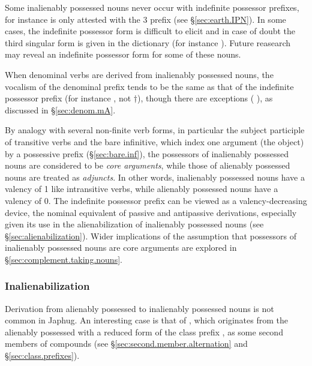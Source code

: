 Some inalienably possessed nouns never occur with indefinite possessor prefixes, for instance  is only attested with the 3\sg{}  prefix (see §\ref{sec:earth.IPN}). In some cases, the indefinite possessor form is difficult to elicit and in case of doubt the third singular form is given in the dictionary \citet{jacques16japhug} (for instance ). Future reasearch may reveal an indefinite possessor form for some of these nouns.

When denominal verbs are derived from inalienably possessed nouns, the vocalism of the denominal prefix tends to be the same as that of the  indefinite possessor prefix (for instance  \fl{} , not $\dagger$), though there are exceptions ( \fl{} ), as discussed in §\ref{sec:denom.mA}.

By analogy with several non-finite verb forms, in particular the subject participle of transitive verbs and the bare infinitive, which index one argument (the object) by a possessive prefix (§\ref{sec:bare.inf}), the possessors of inalienably possessed nouns are considered to be \textit{core arguments}, while those of alienably possessed nouns are treated as \textit{adjuncts}. In other words, inalienably possessed nouns have a valency of 1 like intransitive verbs, while alienably possessed nouns have a valency of 0. The indefinite possessor prefix can be viewed as a valency-decreasing device, the nominal equivalent of passive and antipassive derivations, especially given its use in the alienabilization of inalienably possessed nouns (see §\ref{sec:alienabilization}). Wider implications of the assumption that possessors of inalienably possessed nouns are core arguments are explored in §\ref{sec:complement.taking.nouns}.

\subsubsection{Inalienabilization} \label{sec:apn.to.ipn}
Derivation from alienably possessed to inalienably possessed nouns is not common in Japhug. An interesting case is that of , which originates from the alienably possessed  with a reduced form  of the class prefix , as some second members of compounds (see §\ref{sec:second.member.alternation} and §\ref{sec:class.prefixes}).

